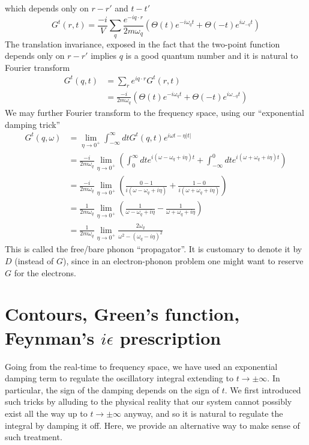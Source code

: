 which depends only on $r-r'$ and $t-t'$
\[ G^t\left( r,t \right) =\frac{-i}{V}\sum_q{\frac{e^{-iq\cdot r}}{2m\omega _q}\left( \Theta \left( t \right) e^{-i\omega _qt}+\Theta \left( -t \right) e^{i\omega _{-q}t} \right)}\]
The translation invariance, exposed in the fact that the two-point function depends only on $r-r'$ implies $q$ is a good quantum number and it is natural to Fourier transform
\begin{align*}
    G^t\left( q,t \right) &=\sum_r{e^{iq\cdot r}G^t\left( r,t \right)}\\
    &=\frac{-i}{2m\omega _q}\left( \Theta \left( t \right) e^{-i\omega _qt}+\Theta \left( -t \right) e^{i\omega _{-q}t} \right)
\end{align*}
We may further Fourier transform to the frequency space, using our ``exponential damping trick''
\begin{align*}
    G^t\left( q,\omega \right) &=\lim_{\eta \rightarrow 0^+} \int_{-\infty}^{\infty}{dtG^t\left( q,t \right) e^{i\omega t-\eta \left| t \right|}}\\
    &=\frac{-i}{2m\omega _q}\lim_{\eta \rightarrow 0^+} \left( \int_0^{\infty}{dte^{i\left( \omega -\omega _q+i\eta \right) t}}+\int_{-\infty}^0{dte^{i\left( \omega +\omega _q+i\eta \right) t}} \right) \\
    &=\frac{-i}{2m\omega _q}\lim_{\eta \rightarrow 0^+} \left( \frac{0-1}{i\left( \omega -\omega _q+i\eta \right)}+\frac{1-0}{i\left( \omega +\omega _q+i\eta \right)} \right) \\
    &=\frac{1}{2m\omega _q}\lim_{\eta \rightarrow 0^+} \left( \frac{1}{\omega -\omega _q+i\eta}-\frac{1}{\omega +\omega _q+i\eta} \right) \\
    &=\frac{1}{2m\omega _q}\lim_{\eta \rightarrow 0^+} \frac{2\omega _q}{\omega ^2-\left( \omega _q-i\eta \right) ^2}
\end{align*}
This is called the free/bare phonon ``propagator''. It is customary to denote it by $D$ (instead of $G$), since in an electron-phonon problem one might want to reserve $G$ for the electrons.

\section{Contours, Green's function, Feynman's $i\epsilon$ prescription}

Going from the real-time to frequency space, we have used an exponential damping term to regulate the oscillatory integral extending to $t\to\pm\infty$. In particular, the sign of the damping depends on the sign of $t$. We first introduced such tricks by alluding to the physical reality that our system cannot possibly exist all the way up to $t\to\pm\infty$ anyway, and so it is natural to regulate the integral by damping it off. Here, we provide an alternative way to make sense of such treatment.


